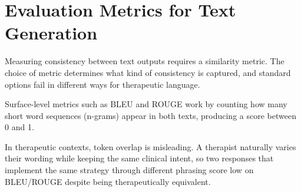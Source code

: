 

\section{Evaluation Metrics for Text Generation}
\label{sec:bg-metrics}
%
%
%

Measuring consistency between text outputs requires a similarity metric.
The choice of metric determines what kind of consistency is captured, and
standard options fail in different ways for therapeutic language.

Surface-level metrics such as BLEU and ROUGE work by counting how many
short word sequences (n-grams) appear in both texts, producing a score
between 0 and 1.

In therapeutic contexts, token overlap is misleading. A therapist
naturally varies their wording while keeping the same clinical intent, so
two responses that implement the same strategy through different phrasing
score low on BLEU/ROUGE despite being therapeutically equivalent.

